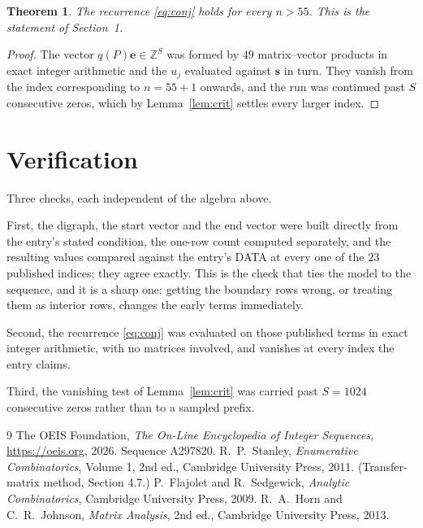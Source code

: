 \documentclass[11pt,a4paper]{article}
\theoremstyle{plain}
\newtheorem{theorem}{Theorem}
\theoremstyle{definition}
\begin{document}
\begin{theorem}
The recurrence \eqref{eq:conj} holds for every $n>55$. This is the statement of
Section~1.
\end{theorem}

\begin{proof}
The vector $q(P)\mathbf{e}\in\mathbb{Z}^{S}$ was formed by $49$ matrix--vector
products in exact integer arithmetic and the $u_j$ evaluated against $\mathbf{s}$ in turn.
They vanish from the index corresponding to $n=55+1$ onwards, and the run was continued
past $S$ consecutive zeros, which by Lemma~\ref{lem:crit} settles every larger index.
\end{proof}

\section{Verification}

Three checks, each independent of the algebra above.

First, the digraph, the start vector and the end vector were built directly from the
entry's stated condition, the one-row count computed separately, and the resulting values
compared against the entry's DATA at every one of the $23$ published indices; they
agree exactly. This is the check that ties the model to the sequence, and it is a sharp one:
getting the boundary rows wrong, or treating them as interior rows, changes the early terms
immediately.

Second, the recurrence \eqref{eq:conj} was evaluated on those published terms in exact
integer arithmetic, with no matrices involved, and vanishes at every index the entry claims.

Third, the vanishing test of Lemma~\ref{lem:crit} was carried past $S=1024$ consecutive
zeros rather than to a sampled prefix.

\begin{thebibliography}{9}
 The OEIS Foundation, \emph{The On-Line Encyclopedia of Integer
Sequences}, \url{https://oeis.org}, 2026. Sequence A297820.
 R.~P.~Stanley, \emph{Enumerative Combinatorics}, Volume 1, 2nd ed.,
Cambridge University Press, 2011. (Transfer-matrix method, Section 4.7.)
 P.~Flajolet and R.~Sedgewick, \emph{Analytic Combinatorics}, Cambridge
University Press, 2009.
 R.~A.~Horn and C.~R.~Johnson, \emph{Matrix Analysis}, 2nd ed., Cambridge
University Press, 2013.
\end{thebibliography}
\end{document}
